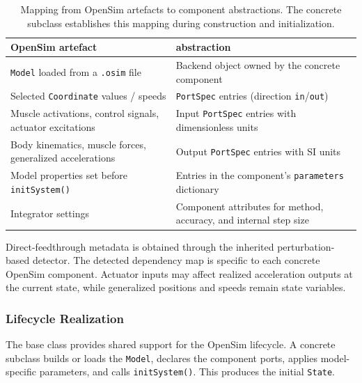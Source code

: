 \begin{table}[t]
  \centering
  \small
  \caption[Mapping from OpenSim artefacts to \syssimx{} abstractions]{Mapping from OpenSim artefacts to \syssimx{} component abstractions.
  The concrete subclass establishes this mapping during construction and initialization.}
  \label{tab:opensim_mapping}
  \begin{tabular}{p{6.5cm} p{8.5cm}}
    \toprule
    \textbf{OpenSim artefact} & \textbf{\syssimx{} abstraction} \\
    \midrule
    \texttt{Model} loaded from a \texttt{.osim} file
      & Backend object owned by the concrete component \\
    \addlinespace
    Selected \texttt{Coordinate} values / speeds
      & \texttt{PortSpec} entries (direction \texttt{in}/\texttt{out}) \\
    \addlinespace
    Muscle activations, control signals, actuator excitations
      & Input \texttt{PortSpec} entries with dimensionless units \\
    \addlinespace
    Body kinematics, muscle forces, generalized accelerations
      & Output \texttt{PortSpec} entries with SI units \\
    \addlinespace
    Model properties set before \texttt{initSystem()}
      & Entries in the component's \texttt{parameters} dictionary \\
    \addlinespace
    Integrator settings
      & Component attributes for method, accuracy, and internal step size \\
    \bottomrule
  \end{tabular}
\end{table}

Direct-feedthrough metadata is obtained through the inherited perturbation-based detector.
The detected dependency map is specific to each concrete OpenSim component.
Actuator inputs may affect realized acceleration outputs at the current state, while generalized positions and speeds remain state variables.

\subsubsection{Lifecycle Realization}

The base class provides shared support for the OpenSim lifecycle.
A concrete subclass builds or loads the \texttt{Model}, declares the component ports, applies model-specific parameters, and calls \texttt{initSystem()}.
This produces the initial \texttt{State}.


